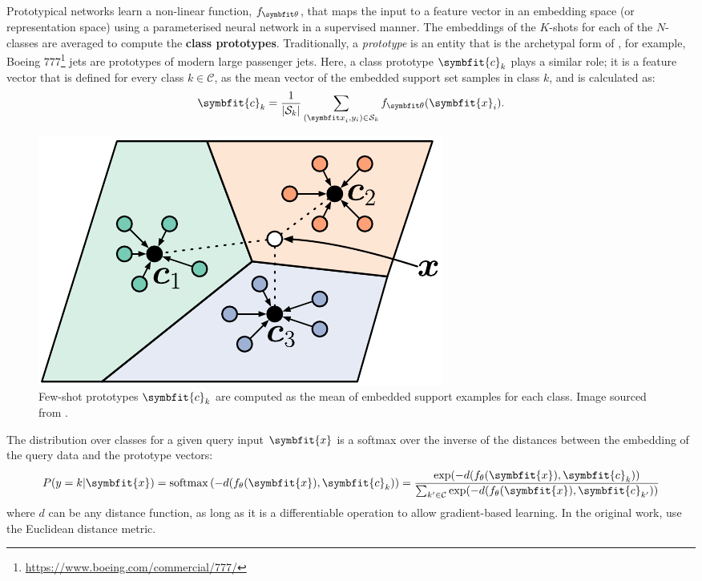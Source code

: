 Prototypical networks learn a non-linear function, $f_{\symbfit \theta}$, that maps the input to a feature vector in an embedding space (or representation space) using a parameterised neural network in a supervised manner. The embeddings of the $K$-shots for each of the $N$-classes are averaged to compute the \textbf{class prototypes}. Traditionally, a \textit{prototype} is an entity that is the archetypal form of , for example, Boeing $777$\footnote{\url{https://www.boeing.com/commercial/777/}} jets are prototypes of modern large passenger jets.
Here, a class prototype $\symbfit{c}_k$ plays a similar role; it is a feature vector that is defined for every class $k \in \mathcal{C}$, as the mean vector of the embedded support set samples in class $k$, and is calculated as:
\begin{equation}
    \symbfit{c}_{k}=\frac{1}{|\mcS_{k}|} \sum_{({\symbfit x}_i, y_i) \in {\mcS_k}} f_{\symbfit \theta}(\symbfit{x}_{i}).
    \label{eqn:fsl-proto-calc}
\end{equation}

\begin{figure}[ht]
    \centering
    \includegraphics[scale=0.85]{chapters/assets/fsl/prototype_fewshot_v3.pdf}
    \caption{Few-shot prototypes $\symbfit{c}_k$ are computed as the mean of embedded support examples for each class. Image sourced from \parencite{Snell2017PrototypicalLearning}.}
    \label{fig:protonets}
\end{figure}

The distribution over classes for a given query input $\symbfit{x}$ is a softmax over the inverse of the distances between the embedding of the query data and the prototype vectors:
\begin{equation}
    P(y=k\vert\symbfit{x})=\operatorname{softmax}\left(-d(f_\theta(\symbfit{x}), \symbfit{c}_k)\right) = \frac{\exp(-d(f_\theta(\symbfit{x}), \symbfit{c}_k))}{\sum_{k^\prime \in \mathcal{C}}\exp(-d(f_\theta(\symbfit{x}), \symbfit{c}_{k^\prime}))}
    \label{eqn:fsl-proto-classification}
\end{equation}
where $d$ can be any distance function, as long as it is a differentiable operation to allow gradient-based learning. In the original work, \textcite{Snell2017PrototypicalLearning} use the Euclidean distance metric.

